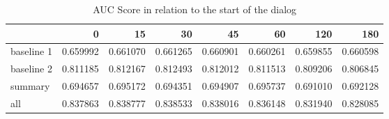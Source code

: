 %
\begin{table}[ht!]
\begin{center}
\begin{tabular}{lrrrrrrr}
\toprule
{} & 0 & 15 & 30 & 45 & 60 & 120 & 180  \\
\midrule
baseline 1 & 0.659992 & 0.661070 & 0.661265 & 0.660901  & 0.660261 & 0.659855 & 0.660598  \\
baseline 2 & 0.811185 & 0.812167 & 0.812493 & 0.812012  & 0.811513 & 0.809206 & 0.806845  \\
summary    & 0.694657 & 0.695172 & 0.694351 & 0.694907  & 0.695737 & 0.691010 & 0.692128  \\
all        & 0.837863 & 0.838777 & 0.838533 & 0.838016  & 0.836148 & 0.831940 & 0.828085  \\

\bottomrule
\end{tabular}
\end{center}
\caption{ AUC Score in relation to the start of the dialog }
\label{table:starttime}
\end{table}

 

